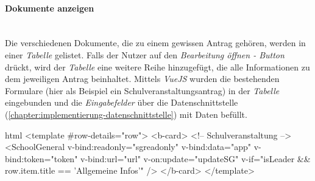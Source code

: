 \paragraph{Dokumente anzeigen}
~\\
Die verschiedenen Dokumente, die zu einem gewissen Antrag gehören, werden in einer \textit{Tabelle} gelistet. Falls der Nutzer auf den \textit{Bearbeitung öffnen - Button} drückt, wird der \textit{Tabelle} eine weitere Reihe hinzugefügt, die alle Informationen zu dem jeweiligen Antrag beinhaltet. Mittels \textit{VueJS} wurden die bestehenden Formulare (hier als Beispiel ein Schulveranstaltungsantrag) in der \textit{Tabelle} eingebunden und die \textit{Eingabefelder} über die Datenschnittstelle (\autoref{chapter:implementierung-datenschnittstelle}) mit Daten befüllt.
\begin{code}{html}
	<template #row-details="row">
        <b-card>
            <!-- Schulveranstaltung -->
            <SchoolGeneral
            v-bind:readonly="sgreadonly"
            v-bind:data="app"
            v-bind:token="token"
            v-bind:url="url"
            v-on:update="updateSG"
            v-if="isLeader && row.item.title == 'Allgemeine Infos'"
            />
		</b-card>
	</template>
\end{code}
	\label{list:docanz} ~\\


